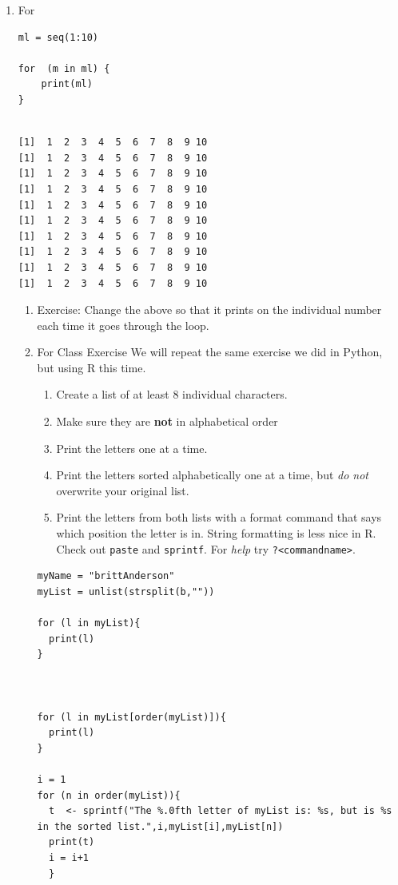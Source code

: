\documentclass{article}
\begin{document}
\begin{enumerate}
\item For
\label{sec:orgd00d872}
\begin{verbatim}
ml = seq(1:10)

for  (m in ml) {
    print(ml)
}
\end{verbatim}

\begin{verbatim}

[1]  1  2  3  4  5  6  7  8  9 10
[1]  1  2  3  4  5  6  7  8  9 10
[1]  1  2  3  4  5  6  7  8  9 10
[1]  1  2  3  4  5  6  7  8  9 10
[1]  1  2  3  4  5  6  7  8  9 10
[1]  1  2  3  4  5  6  7  8  9 10
[1]  1  2  3  4  5  6  7  8  9 10
[1]  1  2  3  4  5  6  7  8  9 10
[1]  1  2  3  4  5  6  7  8  9 10
[1]  1  2  3  4  5  6  7  8  9 10
\end{verbatim}
\begin{enumerate}
\item Exercise:
\label{sec:org4fd47c6}
Change the above so that it prints on the individual number each time it goes through the loop. 

\item For Class Exercise
\label{sec:orgfc5eab4}
We will repeat the same exercise we did in Python, but using R this time. 
\begin{enumerate}
\item Create a list of at least 8 individual characters.
\item Make sure they are \textbf{\textbf{not}} in alphabetical order
\item Print the letters one at a time.
\item Print the letters sorted alphabetically one at a time, but \emph{do not} overwrite your original list.
\item Print the letters from both lists with a format command that says which position the letter is in. String formatting is less nice in R. Check out \texttt{paste} and \texttt{sprintf}. For \emph{help} try \texttt{?<commandname>}.
\end{enumerate}

\begin{verbatim}
myName = "brittAnderson"
myList = unlist(strsplit(b,""))

for (l in myList){
  print(l)
}



for (l in myList[order(myList)]){
  print(l)
}

i = 1
for (n in order(myList)){
  t  <- sprintf("The %.0fth letter of myList is: %s, but is %s in the sorted list.",i,myList[i],myList[n])
  print(t)
  i = i+1  
  }
\end{verbatim}


\end{enumerate}
\end{enumerate}
\end{document}
